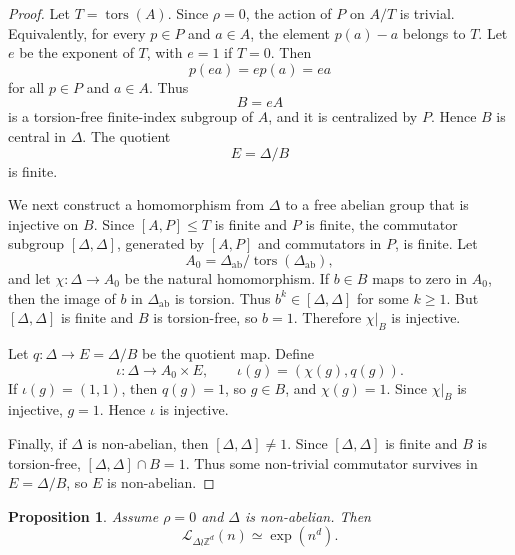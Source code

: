 \documentclass[11pt]{article}
\newcommand{\LEF}{\mathcal L}
\newcommand{\Z}{\mathbb Z}
\newcommand{\tors}{\operatorname{tors}}
\newtheorem{proposition}[theorem]{Proposition}
\begin{document}
\begin{proof}
Let \(T=\tors(A)\). Since \(\rho=0\), the action of \(P\) on \(A/T\) is trivial. Equivalently, for every \(p\in P\) and \(a\in A\), the element \(p(a)-a\) belongs to \(T\). Let \(e\) be the exponent of \(T\), with \(e=1\) if \(T=0\). Then
\[
p(ea)=ep(a)=ea
\]
for all \(p\in P\) and \(a\in A\). Thus
\[
B=eA
\]
is a torsion-free finite-index subgroup of \(A\), and it is centralized by \(P\). Hence \(B\) is central in \(\Delta\). The quotient
\[
E=\Delta/B
\]
is finite.

We next construct a homomorphism from \(\Delta\) to a free abelian group that is injective on \(B\). Since \([A,P]\le T\) is finite and \(P\) is finite, the commutator subgroup \([\Delta,\Delta]\), generated by \([A,P]\) and commutators in \(P\), is finite. Let
\[
A_0=\Delta_{\mathrm{ab}}/\tors(\Delta_{\mathrm{ab}}),
\]
and let \(\chi:\Delta\to A_0\) be the natural homomorphism. If \(b\in B\) maps to zero in \(A_0\), then the image of \(b\) in \(\Delta_{\mathrm{ab}}\) is torsion. Thus \(b^k\in[\Delta,\Delta]\) for some \(k\ge 1\). But \([\Delta,\Delta]\) is finite and \(B\) is torsion-free, so \(b=1\). Therefore \(\chi|_B\) is injective.

Let \(q:\Delta\to E=\Delta/B\) be the quotient map. Define
\[
\iota:\Delta\to A_0\times E,\qquad \iota(g)=(\chi(g),q(g)).
\]
If \(\iota(g)=(1,1)\), then \(q(g)=1\), so \(g\in B\), and \(\chi(g)=1\). Since \(\chi|_B\) is injective, \(g=1\). Hence \(\iota\) is injective.

Finally, if \(\Delta\) is non-abelian, then \([\Delta,\Delta]\neq 1\). Since \([\Delta,\Delta]\) is finite and \(B\) is torsion-free, \([\Delta,\Delta]\cap B=1\). Thus some non-trivial commutator survives in \(E=\Delta/B\), so \(E\) is non-abelian.
\end{proof}

\begin{proposition}
Assume \(\rho=0\) and \(\Delta\) is non-abelian. Then
\[
\LEF_{\Delta\wr\Z^d}(n)\simeq \exp(n^d).
\]
\end{proposition}
\end{document}
